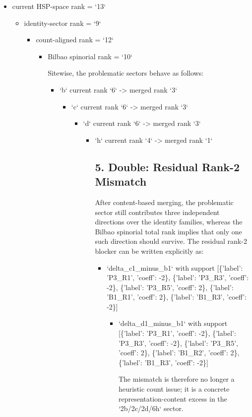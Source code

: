 \documentclass[11pt]{article}
\begin{document}
\begin{itemize}
\begin{itemize}
\begin{itemize}
\begin{itemize}
\begin{itemize}
\begin{itemize}
\begin{itemize}
\begin{itemize}
\begin{itemize}
\begin{itemize}
\begin{itemize}
\item current HSP-space rank = `13`
\begin{itemize}
\item identity-sector rank = `9`
\begin{itemize}
\item count-aligned rank = `12`
\begin{itemize}
\item Bilbao spinorial rank = `10`

        Sitewise, the problematic sectors behave as follows:

\begin{itemize}
\item `b` current rank `6` -> merged rank `3`
\begin{itemize}
\item `c` current rank `6` -> merged rank `3`
\begin{itemize}
\item `d` current rank `6` -> merged rank `3`
\begin{itemize}
\item `h` current rank `4` -> merged rank `1`

\subsection*{5. Double: Residual Rank-2 Mismatch}

        After content-based merging, the problematic sector still contributes three independent directions over the identity families, whereas the Bilbao spinorial total rank implies that only one such direction should survive. The residual rank-2 blocker can be written explicitly as:

\begin{itemize}
\item `delta\_c1\_minus\_b1` with support [\{'label': 'P3\_R1', 'coeff': -2\}, \{'label': 'P3\_R3', 'coeff': -2\}, \{'label': 'P3\_R5', 'coeff': 2\}, \{'label': 'B1\_R1', 'coeff': 2\}, \{'label': 'B1\_R3', 'coeff': -2\}]
\begin{itemize}
\item `delta\_d1\_minus\_b1` with support [\{'label': 'P3\_R1', 'coeff': -2\}, \{'label': 'P3\_R3', 'coeff': -2\}, \{'label': 'P3\_R5', 'coeff': 2\}, \{'label': 'B1\_R2', 'coeff': 2\}, \{'label': 'B1\_R3', 'coeff': -2\}]

        The mismatch is therefore no longer a heuristic count issue; it is a concrete representation-content excess in the `2b/2c/2d/6h` sector.


\end{itemize}
\end{itemize}
\end{itemize}
\end{itemize}
\end{itemize}
\end{itemize}
\end{itemize}
\end{itemize}
\end{itemize}
\end{itemize}
\end{itemize}
\end{itemize}
\end{itemize}
\end{itemize}
\end{itemize}
\end{itemize}
\end{itemize}
\end{itemize}
\end{itemize}
\end{itemize}
\end{document}
